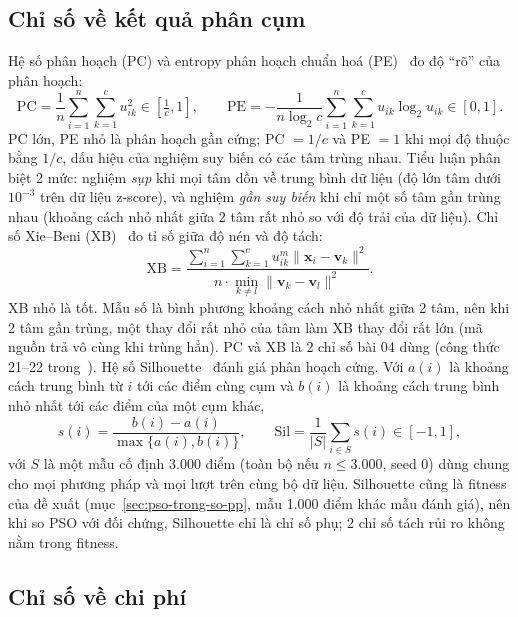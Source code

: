\subsection{Chỉ số về kết quả phân cụm}
Hệ số phân hoạch (PC) và entropy phân hoạch chuẩn hoá (PE)~\cite{bezdek1981pattern} đo độ ``rõ'' của phân hoạch:
\begin{equation}
  \mathrm{PC} = \frac{1}{n} \sum_{i=1}^{n} \sum_{k=1}^{c} u_{ik}^{2} \in \left[\tfrac{1}{c}, 1\right], \qquad
  \mathrm{PE} = -\frac{1}{n \log_2 c} \sum_{i=1}^{n} \sum_{k=1}^{c} u_{ik} \log_2 u_{ik} \in [0, 1].
  \label{eq:chi-so-pc-pe}
\end{equation}
PC lớn, PE nhỏ là phân hoạch gần cứng; PC $= 1/c$ và PE $= 1$ khi mọi độ thuộc bằng $1/c$, dấu hiệu của nghiệm suy biến có
các tâm trùng nhau. Tiểu luận phân biệt 2 mức: nghiệm \emph{sụp} khi mọi tâm dồn về trung bình dữ liệu (độ lớn tâm dưới
$10^{-3}$ trên dữ liệu z-score), và nghiệm \emph{gần suy biến} khi chỉ một số tâm gần trùng nhau (khoảng cách nhỏ nhất giữa
2 tâm rất nhỏ so với độ trải của dữ liệu). Chỉ số Xie--Beni (XB)~\cite{xie1991validity} đo tỉ số giữa độ nén và độ tách:
\begin{equation}
  \mathrm{XB} = \frac{\sum_{i=1}^{n} \sum_{k=1}^{c} u_{ik}^{m} \lVert \mathbf{x}_i - \mathbf{v}_k \rVert^{2}}
                     {n \cdot \min_{k \ne l} \lVert \mathbf{v}_k - \mathbf{v}_l \rVert^{2}}.
  \label{eq:chi-so-xb}
\end{equation}
XB nhỏ là tốt. Mẫu số là bình phương khoảng cách nhỏ nhất giữa 2 tâm, nên khi 2 tâm gần trùng, một thay đổi rất nhỏ
của tâm làm XB thay đổi rất lớn (mã nguồn trả vô cùng khi trùng hẳn). PC và XB là 2 chỉ số bài 04 dùng (công thức 21--22
trong~\cite{zhang2025qpsofcm}). Hệ số Silhouette~\cite{rousseeuw1987silhouettes} đánh giá phân hoạch cứng. Với $a(i)$ là
khoảng cách trung bình từ $i$ tới các điểm cùng cụm và $b(i)$ là khoảng cách trung bình nhỏ nhất tới các điểm của một cụm
khác,
\begin{equation}
  s(i) = \frac{b(i) - a(i)}{\max\{a(i), b(i)\}}, \qquad \mathrm{Sil} = \frac{1}{|S|} \sum_{i \in S} s(i) \in [-1, 1],
  \label{eq:chi-so-sil}
\end{equation}
với $S$ là một mẫu cố định $3.000$ điểm (toàn bộ nếu $n \le 3.000$, seed 0) dùng chung cho mọi phương pháp và mọi lượt
trên cùng bộ dữ liệu.
Silhouette cũng là fitness của đề xuất (mục~\ref{sec:pso-trong-so-pp}, mẫu 1.000 điểm khác mẫu đánh giá), nên
khi so PSO với đối chứng, Silhouette chỉ là chỉ số phụ; 2 chỉ số tách rủi ro không nằm trong fitness.
\subsection{Chỉ số về chi phí}

